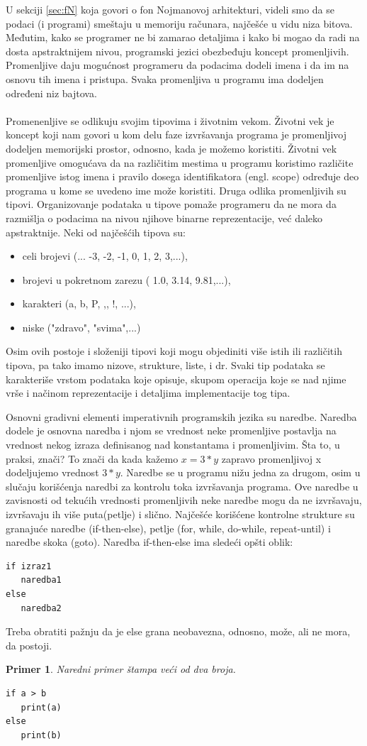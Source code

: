 \documentclass[a4paper]{article}
\newtheorem{primer}{Primer}[section]
\begin{document}
U sekciji \ref{sec:fN} koja govori o fon Nojmanovoj arhitekturi, videli smo da se podaci (i programi) smeštaju u memoriju računara, najčešće u vidu niza bitova. Međutim, kako se programer ne bi zamarao detaljima i kako bi mogao da radi na dosta apstraktnijem nivou, programski jezici obezbeđuju koncept promenljivih. Promenljive daju mogućnost programeru da podacima dodeli imena i da im na osnovu tih imena i pristupa. Svaka promenljiva u programu ima dodeljen određeni niz bajtova. \\\\
Promenenljive se odlikuju svojim tipovima i životnim vekom. Životni vek je koncept koji nam govori u kom delu faze izvršavanja programa je promenljivoj dodeljen memorijski prostor, odnosno, kada je možemo koristiti. Životni vek promenljive omogućava da na različitim mestima u programu koristimo različite promenljive istog imena i pravilo dosega identifikatora (engl. scope) određuje deo programa u kome se uvedeno ime može koristiti. Druga odlika promenljivih su tipovi. Organizovanje podataka u tipove pomaže programeru da ne mora da razmišlja o podacima na nivou njihove binarne reprezentacije, već daleko apstraktnije. Neki od najčešćih tipova su:
\begin{itemize}
\item celi brojevi (... -3, -2, -1, 0, 1, 2, 3,...),
\item brojevi u pokretnom zarezu ( 1.0, 3.14, 9.81,...),
\item karakteri (a, b, P, ,, !, ...),
\item niske ("zdravo", "svima",...)
\end{itemize} 
Osim ovih postoje i složeniji tipovi koji mogu objediniti više istih ili različitih tipova, pa tako imamo nizove, strukture, liste, i dr.
Svaki tip podataka se karakteriše vrstom podataka koje opisuje, skupom operacija koje se nad njime vrše i načinom reprezentacije i detaljima implementacije tog tipa.

Osnovni gradivni elementi imperativnih programskih jezika su naredbe.
Naredba dodele je osnovna naredba i njom se vrednost neke promenljive postavlja na vrednost nekog izraza definisanog nad konstantama i promenljivim. Šta to, u praksi, znači? To znači da kada kažemo $x = 3*y$ zapravo promenljivoj x dodeljujemo vrednost $3*y$. Naredbe se u programu nižu jedna za drugom, osim u slučaju korišćenja naredbi za kontrolu toka izvršavanja programa. Ove naredbe u zavisnosti od tekućih
vrednosti promenljivih neke naredbe mogu da ne izvršavaju, izvršavaju ih više puta(petlje) i slično. Najčešće korišćene kontrolne strukture su granajuće naredbe (if-then-else), petlje (for, while, do-while, repeat-until) i naredbe skoka (goto). Naredba if-then-else ima sledeći opšti oblik:
\begin{verbatim}
if izraz1 
   naredba1
else 
   naredba2
\end{verbatim}
Treba obratiti pažnju da je else grana neobavezna, odnosno, može, ali ne mora, da postoji. 
\begin{primer}
Naredni primer štampa veći od dva broja.
\begin{verbatim}
if a > b
   print(a)
else
   print(b)
\end{verbatim}
\end{primer}
\end{document}
